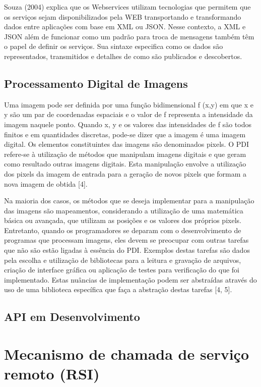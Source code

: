 \documentclass[12pt]{article}
\begin{document}
Souza (2004) explica que os Webservices utilizam tecnologias que permitem que
os serviços sejam disponibilizados pela WEB transportando e transformando dados
entre aplicações com base em XML ou JSON. Nesse contexto, a XML e JSON além de
funcionar como um padrão para troca de mensagens também têm o papel de definir os
serviços. Sua sintaxe especifica como os dados são representados, transmitidos e
detalhes de como são publicados e descobertos.

\subsection{Processamento Digital de Imagens}

Uma imagem pode ser definida por uma função bidimensional f (x,y) em que x e y são um par de coordenadas espaciais e o valor de f representa a intensidade da
imagem naquele ponto. Quando x, y e os valores das intensidades de f são todos finitos e em quantidades discretas, pode-se dizer que a imagem é uma imagem
digital. Os elementos constituintes das imagens são denominados pixels. O PDI refere-se à utilização de métodos que manipulam imagens digitais e que geram
como resultado outras imagens digitais. Esta manipulação envolve a utilização dos pixels da imagem de entrada para a geração de novos pixels que formam a
nova imagem de obtida [4].

Na maioria dos casos, os métodos que se deseja implementar para a manipulação das imagens são mapeamentos, considerando a utilização de uma matemática
básica ou avançada, que utilizam as posições e os valores dos próprios pixels. Entretanto, quando os programadores se deparam com o desenvolvimento de
programas que processam imagens, eles devem se preocupar com outras tarefas que não são estão ligadas à essência do PDI. Exemplos destas tarefas são dados
pela escolha e utilização de bibliotecas para a leitura e gravação de arquivos, criação de interface gráfica ou aplicação de testes para verificação do que foi
implementado. Estas nuâncias de implementação podem ser abstraídas através do uso de uma biblioteca específica que faça a abstração destas tarefas [4, 5].

\subsection{API em Desenvolvimento}


\section{Mecanismo de chamada de serviço remoto (RSI)}
\end{document}
